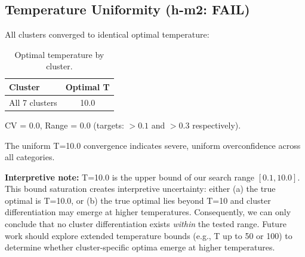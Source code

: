 \subsection{Temperature Uniformity (h-m2: FAIL)}
\label{sec:temperature}

All clusters converged to identical optimal temperature:

\begin{table}[h]
\centering
\begin{tabular}{@{}lc@{}}
\toprule
\textbf{Cluster} & \textbf{Optimal T} \\
\midrule
All 7 clusters & 10.0 \\
\bottomrule
\end{tabular}
\caption{Optimal temperature by cluster.}
\label{tab:temperature}
\end{table}

CV = 0.0, Range = 0.0 (targets: $>0.1$ and $>0.3$ respectively).

The uniform T=10.0 convergence indicates severe, uniform overconfidence across all categories.

\textbf{Interpretive note:} T=10.0 is the upper bound of our search range $[0.1, 10.0]$. This bound saturation creates interpretive uncertainty: either (a) the true optimal is T=10.0, or (b) the true optimal lies beyond T=10 and cluster differentiation may emerge at higher temperatures. Consequently, we can only conclude that no cluster differentiation exists \emph{within} the tested range. Future work should explore extended temperature bounds (e.g., T up to 50 or 100) to determine whether cluster-specific optima emerge at higher temperatures.
